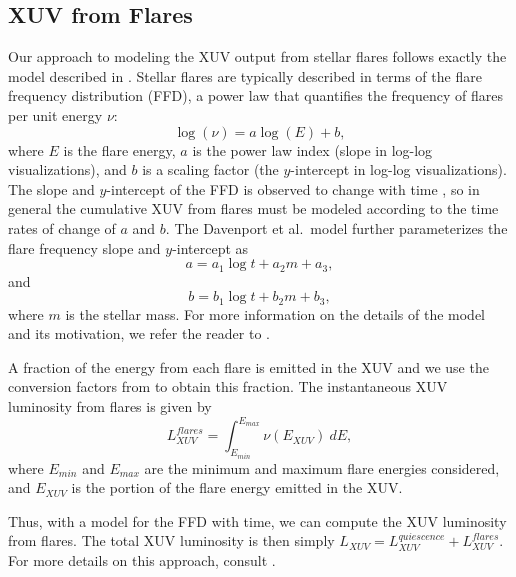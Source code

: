 \documentclass[preprint]{aastex631}
\def\eg{{\it e.g., }}
\begin{document}
\subsection{XUV from Flares\label{sec:flaremodel}}

Our approach to modeling the XUV output from stellar flares follows exactly the model described in \citet{Amaral22}. Stellar flares are typically described in terms of the flare frequency distribution (FFD), a power law that quantifies the frequency of flares per unit energy $\nu$: 
\begin{equation}
\label{eq:ffd}
    \log(\nu) = a\log(E) + b,
\end{equation}
where $E$ is the flare energy, $a$ is the power law index (slope in log-log visualizations), and $b$ is a scaling factor (the $y$-intercept in log-log visualizations). The slope and $y$-intercept of the FFD is observed to change with time \citep[\eg][]{Davenport19}, so in general the cumulative XUV from flares must be modeled according to the time rates of change of $a$ and $b$.
The Davenport et al.~model further parameterizes the flare frequency slope and $y$-intercept as
\begin{equation}
\label{eq:ffd_a}
    a = a_1\log t + a_2 m + a_3,
\end{equation}
and
\begin{equation}
\label{eq:ffd_b}
    b = b_1\log t + b_2 m + b_3,
\end{equation}
where $m$ is the stellar mass. For more information on the details of the model and its motivation, we refer the reader to \citep{Davenport19}.

A fraction of the energy from each flare is emitted in the XUV and we use the conversion factors from
\citet[][Table 2]{OstenWolk15} to obtain this fraction. The instantaneous XUV luminosity from flares is given by
\begin{equation}
       L_{XUV}^{flares} = \int_{E_{min}}^{E_{max}} \nu(E_{XUV})\ dE,
\label{eq:LXUVFlare}
\end{equation}
where $E_{min}$ and $E_{max}$ are the minimum and maximum flare energies considered, and $E_{XUV}$ is the portion of the flare energy emitted in the XUV. 

Thus, with a model for the FFD with time, we can compute the XUV luminosity from flares. The total XUV luminosity is then simply $L_{XUV} = L_{XUV}^{quiescence} + L_{XUV}^{flares}$. For more details on this approach, consult \citet{Amaral22}.
\end{document}

